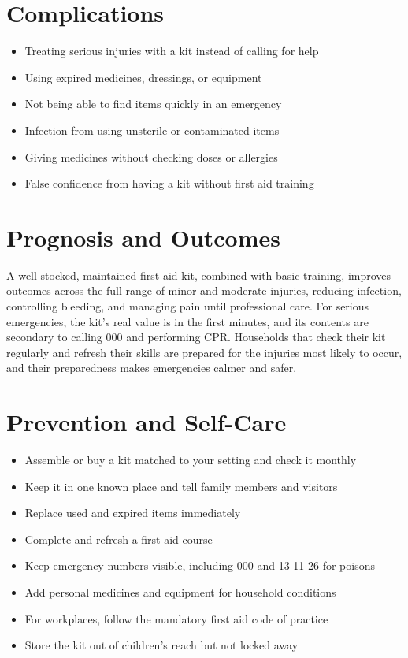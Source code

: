 \section*{Complications}
\begin{itemize}
    \item Treating serious injuries with a kit instead of calling for help
    \item Using expired medicines, dressings, or equipment
    \item Not being able to find items quickly in an emergency
    \item Infection from using unsterile or contaminated items
    \item Giving medicines without checking doses or allergies
    \item False confidence from having a kit without first aid training
\end{itemize}

\section*{Prognosis and Outcomes}
A well-stocked, maintained first aid kit, combined with basic training, improves outcomes across the full range of minor and moderate injuries, reducing infection, controlling bleeding, and managing pain until professional care. For serious emergencies, the kit's real value is in the first minutes, and its contents are secondary to calling 000 and performing CPR. Households that check their kit regularly and refresh their skills are prepared for the injuries most likely to occur, and their preparedness makes emergencies calmer and safer.

\section*{Prevention and Self-Care}
\begin{itemize}
    \item Assemble or buy a kit matched to your setting and check it monthly
    \item Keep it in one known place and tell family members and visitors
    \item Replace used and expired items immediately
    \item Complete and refresh a first aid course
    \item Keep emergency numbers visible, including 000 and 13 11 26 for poisons
    \item Add personal medicines and equipment for household conditions
    \item For workplaces, follow the mandatory first aid code of practice
    \item Store the kit out of children's reach but not locked away
\end{itemize}

